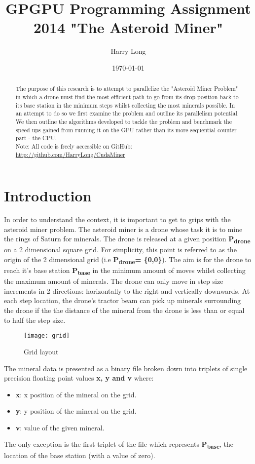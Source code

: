 \documentclass[11pt]{IEEEtran}
\begin{document}
\title{GPGPU Programming Assignment 2014 \newline "The Asteroid Miner"}
\author{Harry Long}
\date{\today}
\maketitle

\begin{abstract}
The purpose of this research is to attempt to parallelize the "Asteroid Miner Problem" in which a drone must find the most efficient path to go from its drop position back to its base station in the minimum steps whilst collecting the most minerals possible. In an attempt to do so we first examine the problem and outline its parallelism potential. We then outline the algorithms developed to tackle the problem and benchmark the speed ups gained from running it on the GPU rather than its more sequential counter part - the CPU.\\[1\baselineskip] 
Note: All code is freely accessible on GitHub: \url{http://github.com/HarryLong/CudaMiner}
\end{abstract}


\section{Introduction}
In order to understand the context, it is important to get to grips with the asteroid miner problem. The asteroid miner is a drone whose task it is to mine the rings of Saturn for minerals. The drone is released at a given position \textbf{P\textsubscript{drone}} on a 2 dimensional square grid. For simplicity, this point is referred to as the origin of the 2 dimensional grid (i.e \textbf{P\textsubscript{drone}= \{0,0\}}). The aim is for the drone to reach it's base station \textbf{P\textsubscript{base}} in the minimum amount of moves whilst collecting the maximum amount of minerals. The drone can only move in step size increments in 2 directions: horizontally to the right and vertically downwards. At each step location, the drone's tractor beam can pick up minerals surrounding the drone if the the distance of the mineral from the drone is less than or equal to half the step size.\\
\begin{figure}[h]
\caption{Grid layout}
\centering
\texttt{[image: grid]}
\end{figure}

The mineral data is presented as a binary file broken down into triplets of single precision floating point values \textbf{x, y and v} where:
\begin{itemize}
  \item \textbf{x}: x position of the mineral on the grid.
  \item \textbf{y}: y position of the mineral on the grid.
  \item \textbf{v}: value of the given mineral.
\end{itemize}
The only exception is the first triplet of the file which represents \textbf{P\textsubscript{base}}, the location of the base station (with a value of zero). 
\end{document}
